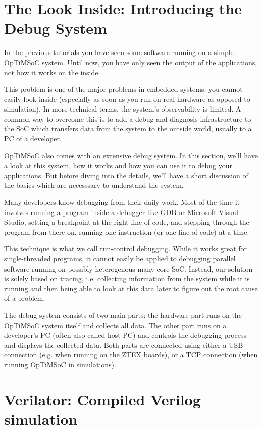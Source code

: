 \section{The Look Inside: Introducing the Debug System}

In the previous tutorials you have seen some software running on a simple
OpTiMSoC system. Until now, you have only seen the output of the applications,
not how it works on the inside.

This problem is one of the major problems in embedded systems: you cannot
easily look inside (especially as soon as you run on real hardware as opposed
to simulation). In more technical terms, the system's observability is
limited. A common way to overcome this is to add a debug and diagnosis
infrastructure to the SoC which transfers data from the system to the outside
world, usually to a PC of a developer.

OpTiMSoC also comes with an extensive debug system. In this section, we'll have
a look at this system, how it works and how you can use it to debug your
applications. But before diving into the details, we'll have a short discussion
of the basics which are necesssary to understand the system.

Many developers know debugging from their daily work. Most of the time it
involves running a program inside a debugger like GDB or Microsoft Visual
Studio, setting a breakpoint at the right line of code, and stepping through the
program from there on, running one instruction (or one line of code) at a time.

This technique is what we call run-control debugging. While it works great for
single-threaded programs, it cannot easily be applied to debugging parallel
software running on possibly heterogenous many-core SoC. Instead, our solution
is solely based on tracing, i.e. collecting information from the system while
it is running and then being able to look at this data later to figure out the
root cause of a problem.

The debug system consists of two main parts: the hardware part runs on the
OpTiMSoC system itself and collects all data. The other part runs on a
developer's PC (often also called host PC) and controls the debugging process
and displays the collected data. Both parts are connected using either a USB
connection (e.g. when running on the ZTEX boards), or a TCP connection (when
running OpTiMSoC in simulations).

\section{Verilator: Compiled Verilog simulation}

